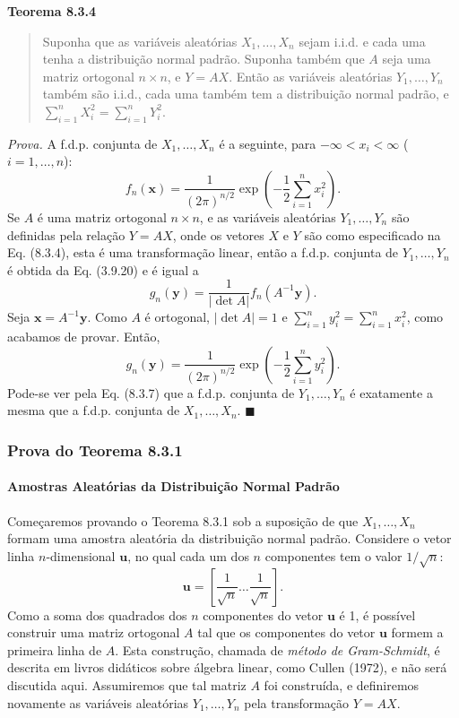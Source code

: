 \vspace{1em}
\noindent\textbf{Teorema 8.3.4}
\begin{quote}
    Suponha que as variáveis aleatórias $X_1, \dots, X_n$ sejam i.i.d. e cada uma tenha a distribuição normal padrão. Suponha também que $A$ seja uma matriz ortogonal $n \times n$, e $Y=AX$. Então as variáveis aleatórias $Y_1, \dots, Y_n$ também são i.i.d., cada uma também tem a distribuição normal padrão, e $\sum_{i=1}^n X_i^2 = \sum_{i=1}^n Y_i^2$.
\end{quote}
\vspace{1em}
\noindent\textit{Prova.} A f.d.p. conjunta de $X_1, \dots, X_n$ é a seguinte, para $-\infty < x_i < \infty$ ($i=1, \dots, n$):
$$
f_n(\mathbf{x}) = \frac{1}{(2\pi)^{n/2}}\exp\left(-\frac{1}{2}\sum_{i=1}^n x_i^2\right).
$$
Se $A$ é uma matriz ortogonal $n \times n$, e as variáveis aleatórias $Y_1, \dots, Y_n$ são definidas pela relação $Y=AX$, onde os vetores $X$ e $Y$ são como especificado na Eq. (8.3.4), esta é uma transformação linear, então a f.d.p. conjunta de $Y_1, \dots, Y_n$ é obtida da Eq. (3.9.20) e é igual a
$$
g_n(\mathbf{y}) = \frac{1}{|\det A|}f_n(A^{-1}\mathbf{y}).
$$
Seja $\mathbf{x} = A^{-1}\mathbf{y}$. Como $A$ é ortogonal, $|\det A|=1$ e $\sum_{i=1}^n y_i^2 = \sum_{i=1}^n x_i^2$, como acabamos de provar. Então,
$$
g_n(\mathbf{y}) = \frac{1}{(2\pi)^{n/2}}\exp\left(-\frac{1}{2}\sum_{i=1}^n y_i^2\right).
$$
Pode-se ver pela Eq. (8.3.7) que a f.d.p. conjunta de $Y_1, \dots, Y_n$ é exatamente a mesma que a f.d.p. conjunta de $X_1, \dots, X_n$. \hfill $\blacksquare$

\subsubsection*{Prova do Teorema 8.3.1}
\paragraph{Amostras Aleatórias da Distribuição Normal Padrão}
Começaremos provando o Teorema 8.3.1 sob a suposição de que $X_1, \dots, X_n$ formam uma amostra aleatória da distribuição normal padrão. Considere o vetor linha $n$-dimensional $\mathbf{u}$, no qual cada um dos $n$ componentes tem o valor $1/\sqrt{n}$:
$$
\mathbf{u} = \left[\frac{1}{\sqrt{n}} \dots \frac{1}{\sqrt{n}}\right].
$$
Como a soma dos quadrados dos $n$ componentes do vetor $\mathbf{u}$ é 1, é possível construir uma matriz ortogonal $A$ tal que os componentes do vetor $\mathbf{u}$ formem a primeira linha de $A$. Esta construção, chamada de \textit{método de Gram-Schmidt}, é descrita em livros didáticos sobre álgebra linear, como Cullen (1972), e não será discutida aqui. Assumiremos que tal matriz $A$ foi construída, e definiremos novamente as variáveis aleatórias $Y_1, \dots, Y_n$ pela transformação $Y=AX$.

